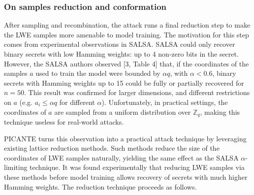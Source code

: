 \documentclass{article}
\begin{document}
\subsubsection{On samples reduction and conformation}
After sampling and recombination, the attack runs a final reduction step to make the LWE samples more amenable to model training. The motivation for this step comes from experimental observations in SALSA. SALSA could only recover binary secrets with low Hamming weights: up to 4 non-zero bits in the secret. However, the SALSA authors observed [3, Table 4] that, if the coordinates of the samples \( a \) used to train the model were bounded by \( \alpha q \), with \( \alpha < 0.6 \), binary secrets with Hamming weights up to 15 could be fully or partially recovered for \( n = 50 \). This result was confirmed for larger dimensions, and different restrictions on \( a \) (e.g. \( a_i \leq \alpha q \) for different \( \alpha \)). Unfortunately, in practical settings, the coordinates of \( a \) are sampled from a uniform distribution over \( \mathbb{Z}_q \), making this technique useless for real-world attacks.

PICANTE turns this observation into a practical attack technique by leveraging existing lattice reduction methods. Such methods reduce the size of the coordinates of LWE samples naturally, yielding the same effect as the SALSA \( \alpha \)-limiting technique. It was found experimentally that reducing LWE samples via these methods before model training allows recovery of secrets with much higher Hamming weights. The reduction technique proceeds as follows.
\end{document}
